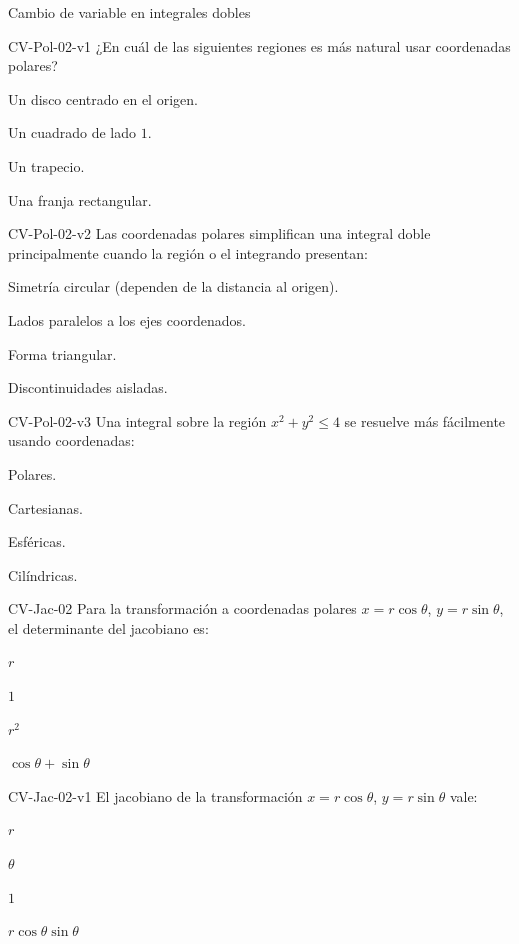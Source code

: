 \documentclass[a4,11pt]{aleph-notas}
\begin{document}
\begin{quiz}{Cambio de variable en integrales dobles}
\begin{multi}[]%
    {CV-Pol-02-v1}
    ¿En cuál de las siguientes regiones es más natural usar coordenadas polares?
    \item* Un disco centrado en el origen.
    \item Un cuadrado de lado $1$.
    \item Un trapecio.
    \item Una franja rectangular.
\end{multi}

\begin{multi}[]%
    {CV-Pol-02-v2}
    Las coordenadas polares simplifican una integral doble principalmente cuando la región o el integrando presentan:
    \item* Simetría circular (dependen de la distancia al origen).
    \item Lados paralelos a los ejes coordenados.
    \item Forma triangular.
    \item Discontinuidades aisladas.
\end{multi}

\begin{multi}[]%
    {CV-Pol-02-v3}
    Una integral sobre la región $x^2+y^2\leq 4$ se resuelve más fácilmente usando coordenadas:
    \item* Polares.
    \item Cartesianas.
    \item Esféricas.
    \item Cilíndricas.
\end{multi}

\begin{multi}[]%
    {CV-Jac-02}
    Para la transformación a coordenadas polares $x = r\cos\theta$, $y = r\sin\theta$, el determinante del jacobiano es:
    \item* $r$
    \item $1$
    \item $r^2$
    \item $\cos\theta + \sin\theta$
\end{multi}

\begin{multi}[]%
    {CV-Jac-02-v1}
    El jacobiano de la transformación $x = r\cos\theta$, $y = r\sin\theta$ vale:
    \item* $r$
    \item $\theta$
    \item $1$
    \item $r\cos\theta\sin\theta$
\end{multi}


\end{quiz}
\end{document}
